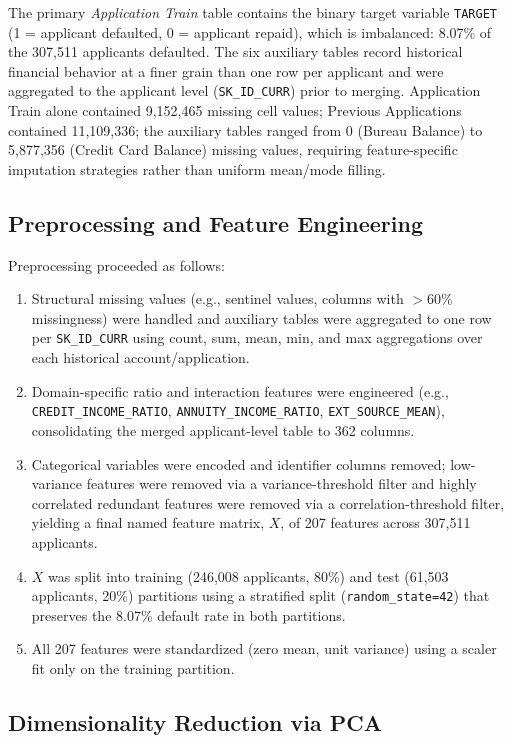 \documentclass[journal]{IEEEtran}
\begin{document}
The primary \emph{Application Train} table contains the binary target variable \texttt{TARGET} (1 = applicant defaulted, 0 = applicant repaid), which is imbalanced: 8.07\% of the 307,511 applicants defaulted. The six auxiliary tables record historical financial behavior at a finer grain than one row per applicant and were aggregated to the applicant level (\texttt{SK\_ID\_CURR}) prior to merging. Application Train alone contained 9,152,465 missing cell values; Previous Applications contained 11,109,336; the auxiliary tables ranged from 0 (Bureau Balance) to 5,877,356 (Credit Card Balance) missing values, requiring feature-specific imputation strategies rather than uniform mean/mode filling.

\subsection{Preprocessing and Feature Engineering}

Preprocessing proceeded as follows:
\begin{enumerate}
\item Structural missing values (e.g., sentinel values, columns with $>60\%$ missingness) were handled and auxiliary tables were aggregated to one row per \texttt{SK\_ID\_CURR} using count, sum, mean, min, and max aggregations over each historical account/application.
\item Domain-specific ratio and interaction features were engineered (e.g., \texttt{CREDIT\_INCOME\_RATIO}, \texttt{ANNUITY\_INCOME\_RATIO}, \texttt{EXT\_SOURCE\_MEAN}), consolidating the merged applicant-level table to 362 columns.
\item Categorical variables were encoded and identifier columns removed; low-variance features were removed via a variance-threshold filter and highly correlated redundant features were removed via a correlation-threshold filter, yielding a final named feature matrix, $X$, of 207 features across 307,511 applicants.
\item $X$ was split into training (246,008 applicants, 80\%) and test (61,503 applicants, 20\%) partitions using a stratified split (\texttt{random\_state=42}) that preserves the 8.07\% default rate in both partitions.
\item All 207 features were standardized (zero mean, unit variance) using a scaler fit only on the training partition.
\end{enumerate}

\subsection{Dimensionality Reduction via PCA}
\end{document}
